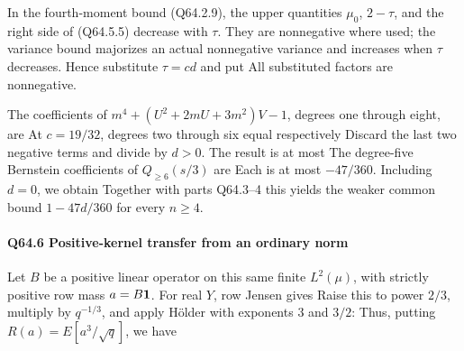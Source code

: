 In the fourth-moment bound (Q64.2.9), the upper quantities \(\mu_0\),
\(2-\tau\), and the right side of (Q64.5.5) decrease with \(\tau\).
They are nonnegative where used; the variance bound majorizes an
actual nonnegative variance and increases when \(\tau\) decreases.
Hence substitute \(\tau=cd\) and put
All substituted factors are nonnegative.

The coefficients of \(m^4+(U^2+2mU+3m^2)V-1\), degrees one through
eight, are
At \(c=19/32\), degrees two through six equal respectively
Discard the last two negative terms and divide by \(d>0\). The result
is at most
The degree-five Bernstein coefficients of \(Q_{\ge6}(s/3)\) are
Each is at most \(-47/360\). Including \(d=0\), we obtain
Together with parts Q64.3--4 this yields the weaker common bound
\(1-47d/360\) for every \(n\ge4\).

\paragraph{Q64.6 Positive-kernel transfer from an ordinary norm}

Let \(B\) be a positive linear operator on this same finite
\(L^2(\mu)\), with strictly positive row mass \(a=B\mathbf1\).
For real \(Y\), row Jensen gives
Raise this to power \(2/3\), multiply by \(q^{-1/3}\), and apply
Hölder with exponents \(3\) and \(3/2\):
Thus, putting \(R(a)=E[a^3/\sqrt q]\), we have


